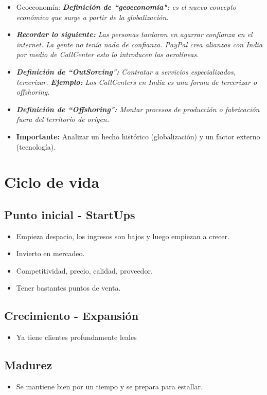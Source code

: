 \begin{itemize}
    \item Geoeconomía: \emph{\textbf{Definición de ``geoeconomía":} es el nuevo concepto económico que surge a partir de la globalización.}
    \item \emph{\textbf{Recordar lo siguiente: }Las personas tardaron en agarrar confianza en el internet. La gente no tenía nada de confianza. PayPal crea alianzas con India por medio de CallCenter esto lo introducen las aerolíneas.}
    \item \emph{\textbf{Definición de ``OutSorcing":} Contratar a servicios especializados, tercerizar. \emph{\textbf{Ejemplo: }Los CallCenters en India es una forma de tercerizar o offshoring.}}
    \item \emph{\textbf{Definición de ``Offshoring":} Montar procesos de producción o fabricación fuera del territorio de orígen.}
    \item \textbf{Importante:} Analizar un hecho histórico (globalización) y un factor externo (tecnología).
\end{itemize}

\section{Ciclo de vida}
\subsection{Punto inicial - StartUps}
\begin{itemize}
    \item Empieza despacio, los ingresos son bajos y luego empiezan a crecer.
    \item Invierto en mercadeo.
    \item Competitividad, precio, calidad, proveedor. 
    \item Tener bastantes puntos de venta.
\end{itemize}

\subsection{Crecimiento - Expansión}
\begin{itemize}
    \item Ya tiene clientes profundamente leales
\end{itemize}

\subsection{Madurez}
\begin{itemize}
    \item Se mantiene bien por un tiempo y se prepara para estallar.
\end{itemize}

